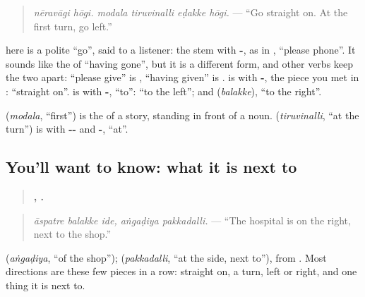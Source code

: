 \begin{quote}
\emph{nēravāgi hōgi. modala tiruvinalli eḍakke hōgi.} — \textquotedblleft{}Go straight on. At the first turn, go left.\textquotedblright{}
\end{quote}

\textbf{} here is a polite \textquotedblleft{}go\textquotedblright{}, said to a listener: the stem with \textbf{-}, as in \textbf{ }, \textquotedblleft{}please phone\textquotedblright{}. It sounds like the \textbf{} of \textquotedblleft{}having gone\textquotedblright{}, but it is a different form, and other verbs keep the two apart: \textquotedblleft{}please give\textquotedblright{} is \textbf{}, \textquotedblleft{}having given\textquotedblright{} is \textbf{}. \textbf{} is \textbf{} with \textbf{-}, the piece you met in \textbf{}: \textquotedblleft{}straight on\textquotedblright{}. \textbf{} is \textbf{} with \textbf{-}, \textquotedblleft{}to\textquotedblright{}: \textquotedblleft{}to the left\textquotedblright{}; and \textbf{} (\emph{balakke}), \textquotedblleft{}to the right\textquotedblright{}.

\textbf{} (\emph{modala}, \textquotedblleft{}first\textquotedblright{}) is the \textbf{} of a story, standing in front of a noun. \textbf{} (\emph{tiruvinalli}, \textquotedblleft{}at the turn\textquotedblright{}) is \textbf{} with \textbf{--} and \textbf{-}, \textquotedblleft{}at\textquotedblright{}.

\subsection*{You'll want to know: what it is next to}
\begin{quote}
\textbf{  ,  .}
\end{quote}

\begin{quote}
\emph{āspatre balakke ide, aṅgaḍiya pakkadalli.} — \textquotedblleft{}The hospital is on the right, next to the shop.\textquotedblright{}
\end{quote}

\textbf{} (\emph{aṅgaḍiya}, \textquotedblleft{}of the shop\textquotedblright{}); \textbf{} (\emph{pakkadalli}, \textquotedblleft{}at the side, next to\textquotedblright{}), from \textbf{}. Most directions are these few pieces in a row: straight on, a turn, left or right, and one thing it is next to.


